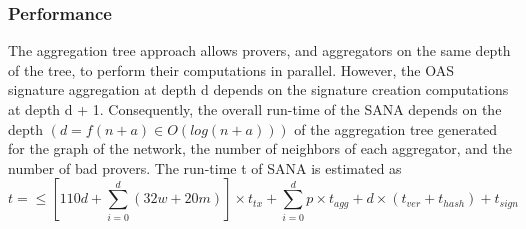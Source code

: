 \documentclass{article}
\begin{document}
\subsubsection{Performance}

The aggregation tree approach allows provers, and aggregators on the same depth of the tree, to perform their computations in parallel. However, the OAS signature aggregation at depth d depends on the signature creation computations at depth d + 1. Consequently, the overall run-time of the SANA depends on the depth $(d = f (n + a) \in O(log(n + a)))$ of the aggregation tree generated for the graph of the network, the number of neighbors of each aggregator, and the number of bad provers. 
The run-time t of SANA is estimated as \begin{equation}
t = \leq \left[ 110d + \sum_{i=0}^d \left( 32w + 20m \right) \right] \times t_{tx} + \sum_{i=0}^d p \times t_{agg} + d \times (t_{ver} + t_{hash}) + t_{sign}
\end{equation}
\end{document}

